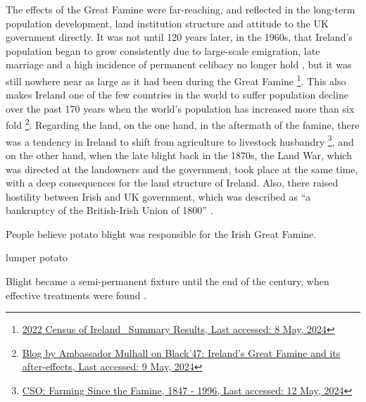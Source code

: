 The effects of the Great Famine were far-reaching, and reflected in the long-term population development, land institution structure and attitude to the UK government directly. It was not until 120 years later, in the 1960s, that Ireland's population began to grow consistently due to large-scale emigration, late marriage and a high incidence of permanent celibacy no longer hold \citep{grada1979population}, but it was still nowhere near as large as it had been during the Great Famine
\footnote{
	\href{https://www.cso.ie/en/releasesandpublications/ep/p-cpsr/censusofpopulation2022-summaryresults/populationchanges/}
	{2022 Census of Ireland \textendash\ Summary Results, Last accessed: 8 May, 2024}
}.
This also makes Ireland one of the few countries in the world to suffer population decline over the past 170 years when the world's population has increased more than six fold
\footnote{
	\href{https://www.dfa.ie/irish-embassy/usa/about-us/ambassador/ambassadors-blog/black47irelandsgreatfamineanditsafter-effects/}
	{Blog by Ambassador Mulhall on Black'47: Ireland's Great Famine and its after-effects, Last accessed: 9 May, 2024}
}. Regarding the land, on the one hand, in the aftermath of the famine, there was a tendency in Ireland to shift from agriculture to livestock husbandry
\footnote{
	\href{https://www.cso.ie/en/statistics/othercsopublications/farmingsincethefamine1847-1996/}{CSO: Farming Since the Famine, 1847 - 1996, Last accessed: 12 May, 2024}
}, and on the other hand, when the late blight back in the 1870s, the Land War, which was directed at the landowners and the government, took place at the same time, with a deep consequences for the land structure of Ireland. Also, there raised hostility between Irish and UK government, which was described as ``a bankruptcy of the British-Irish Union of 1800'' \citep{gray2021great}.





People believe potato blight was responsible for the Irish Great Famine. 

lumper potato

Blight became a semi-permanent fixture until the end of the century, when effective treatments were found \citep{o1994economic}.